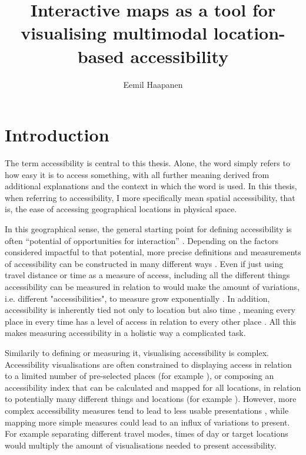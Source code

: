 \documentclass[12pt]{article}
\title{Interactive maps as a tool for visualising multimodal location-based accessibility}
\author{Eemil Haapanen}
\begin{document}
\maketitle

\section{Introduction}
The term accessibility is central to this thesis.
Alone, the word simply refers to how easy it is to access something,
with all further meaning derived from
additional explanations and the context in which the word is used.
In this thesis, when referring to accessibility,
I more specifically mean spatial accessibility,
that is, the ease of accessing geographical locations in physical space.

In this geographical sense,
the general starting point for defining accessibility is often
\enquote{potential of opportunities for interaction} \parencite{han1959}.  %
Depending on the factors considered impactful to that potential,
more precise definitions and measurements of accessibility can be constructed in many different ways
\parencite{pap2016}.
Even if just using travel distance or time as a measure of access,
including all the different things accessibility can be measured in relation to
would make the amount of variations, i.e. different "accessibilities",
to measure grow exponentially \parencite{lev2020}.
In addition, accessibility is inherently tied not only to location
but also time \parencite{jar2018},
meaning every place in every time has a level of access
in relation to every other place \parencite{lev2020}.
All this makes measuring accessibility in a holistic way a complicated task.

Similarily to defining or measuring it,
visualising accessibility is complex.
Accessibility visualisations are often constrained to displaying access in relation to
a limited number of pre-selected places (for example \textcite{wei2018}),
or composing an accessibility index that can be calculated and mapped for all locations,
in relation to potentially many different things and locations (for example \textcite{kim2019}).
However, more complex accessibility measures tend to lead to
less usable presentations \parencite{te2014},
while mapping more simple measures could lead to an influx of variations to present.
For example separating different travel modes, times of day or target locations
would multiply the amount of visualisations needed to present accessibility.
\end{document}
